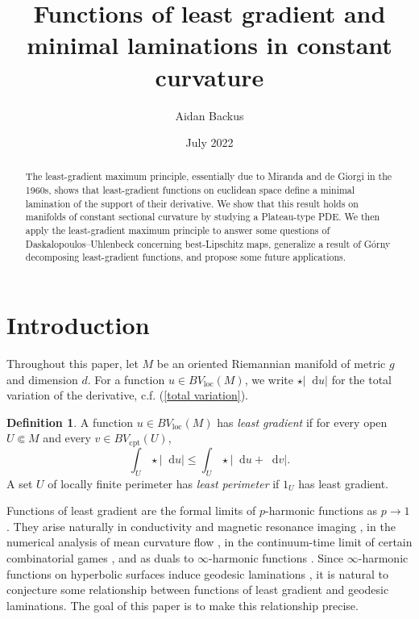 \documentclass[reqno,10pt]{amsart}
\title{Functions of least gradient and minimal laminations in constant curvature}
\author{Aidan Backus}
\date{July 2022}
\newcommand*\dif{\mathop{}\!\mathrm{d}}
\newcommand{\dfn}[1]{\emph{#1}\index{#1}}
\newcommand{\loc}{\mathrm{loc}}
\newcommand{\cpt}{\mathrm{cpt}}
\theoremstyle{definition}
\newtheorem{definition}[theorem]{Definition}
\numberwithin{equation}{section}
\begin{document}
\begin{abstract}
The least-gradient maximum principle, essentially due to Miranda and de Giorgi in the 1960s, shows that least-gradient functions on euclidean space define a minimal lamination of the support of their derivative.
We show that this result holds on manifolds of constant sectional curvature by studying a Plateau-type PDE.
We then apply the least-gradient maximum principle to answer some questions of Daskalopoulos--Uhlenbeck concerning best-Lipschitz maps, generalize a result of G\'orny decomposing least-gradient functions, and propose some future applications.
\end{abstract}

\maketitle



\section{Introduction}
Throughout this paper, let $M$ be an oriented Riemannian manifold of metric $g$ and dimension $d$.
For a function $u \in BV_\loc(M)$, we write $\star |\dif u|$ for the total variation of the derivative, c.f. (\ref{total variation}).

\begin{definition}\label{main definitions}
A function $u \in BV_\loc(M)$ has \dfn{least gradient} if for every open $U \Subset M$ and every $v \in BV_\cpt(U)$,
\begin{equation}\label{least gradient functional}
\int_U \star |\dif u| \leq \int_U \star |\dif u + \dif v|.
\end{equation}
A set $U$ of locally finite perimeter has \dfn{least perimeter} if $1_U$ has least gradient.
\end{definition}

Functions of least gradient are the formal limits of $p$-harmonic functions as $p \to 1$.
They arise naturally in conductivity and magnetic resonance imaging \cite{Tamasan2019, Joy09}, in the numerical analysis of mean curvature flow \cite{Thomas05}, in the continuum-time limit of certain combinatorial games \cite{Kohn06}, and as duals to $\infty$-harmonic functions \cite{daskalopoulos2020transverse}.
Since $\infty$-harmonic functions on hyperbolic surfaces induce geodesic laminations \cite{daskalopoulos2020transverse}, it is natural to conjecture some relationship between functions of least gradient and geodesic laminations.
The goal of this paper is to make this relationship precise.
\end{document}
